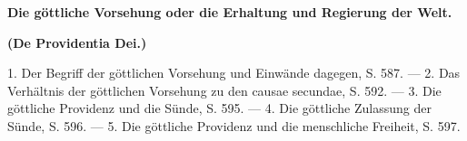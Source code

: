 \vspace{2em}

\centerline{\textbf{Die göttliche Vorsehung oder die Erhaltung und Regierung der Welt.}}
\centerline{\textbf{(De Providentia Dei.)}}

\vspace{1em}

1. Der Begriff der göttlichen Vorsehung und Einwände dagegen, S. 587. --- 2. Das Verhältnis der göttlichen Vorsehung zu den causae secundae, S. 592. --- 3. Die göttliche Providenz und die Sünde, S. 595. --- 4. Die göttliche Zulassung der Sünde, S. 596. --- 5. Die göttliche Providenz und die menschliche Freiheit, S. 597.